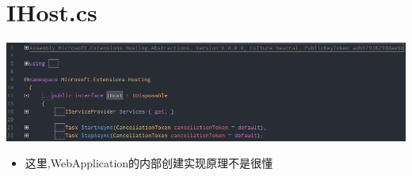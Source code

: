 \documentclass[9pt, b5paper]{article}
\begin{document}
\section{IHost.cs}
\label{sec-3}

\includegraphics[width=.9\linewidth]{./pic/readme_20230101_222709.png}
\begin{itemize}
\item 这里,WebApplication的内部创建实现原理不是很懂
\end{itemize}
\end{document}
